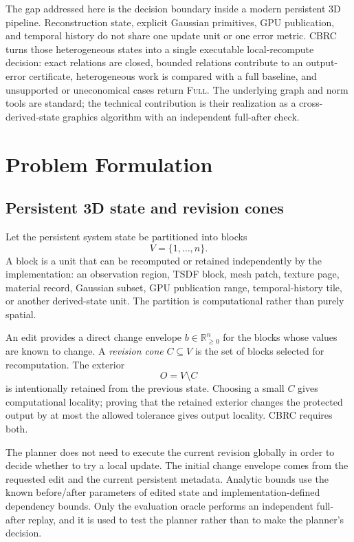 \documentclass[acmtog,nonacm]{acmart}
\newcommand{\method}{CBRC}
\newcommand{\FULL}{\textsc{Full}}
\begin{document}
The gap addressed here is the decision boundary inside a modern persistent 3D pipeline. Reconstruction state, explicit Gaussian primitives, GPU publication, and temporal history do not share one update unit or one error metric. \method{} turns those heterogeneous states into a single executable local-recompute decision: exact relations are closed, bounded relations contribute to an output-error certificate, heterogeneous work is compared with a full baseline, and unsupported or uneconomical cases return \FULL{}. The underlying graph and norm tools are standard; the technical contribution is their realization as a cross-derived-state graphics algorithm with an independent full-after check.

\section{Problem Formulation}
\subsection{Persistent 3D state and revision cones}
Let the persistent system state be partitioned into blocks
\begin{equation}
V = \{1,\ldots,n\}.
\end{equation}
A block is a unit that can be recomputed or retained independently by the implementation: an observation region, TSDF block, mesh patch, texture page, material record, Gaussian subset, GPU publication range, temporal-history tile, or another derived-state unit. The partition is computational rather than purely spatial.

An edit provides a direct change envelope $b\in\mathbb{R}_{\ge 0}^{n}$ for the blocks whose values are known to change. A \emph{revision cone} $C\subseteq V$ is the set of blocks selected for recomputation. The exterior
\begin{equation}
O = V\setminus C
\end{equation}
is intentionally retained from the previous state. Choosing a small $C$ gives computational locality; proving that the retained exterior changes the protected output by at most the allowed tolerance gives output locality. \method{} requires both.

The planner does not need to execute the current revision globally in order to decide whether to try a local update. The initial change envelope comes from the requested edit and the current persistent metadata. Analytic bounds use the known before/after parameters of edited state and implementation-defined dependency bounds. Only the evaluation oracle performs an independent full-after replay, and it is used to test the planner rather than to make the planner's decision.
\end{document}

